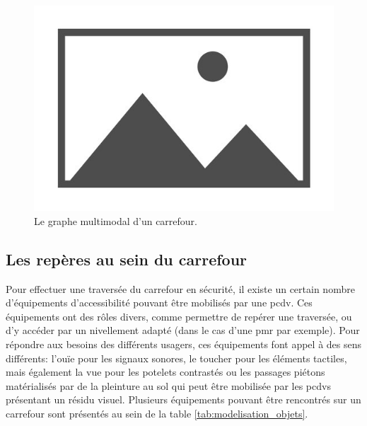 \begin{figure}
    \centering
    \includegraphics{images/placeholder.jpg}
    \caption{Le graphe multimodal d'un carrefour.}
    \label{fig:mod_ex_graphe_carrefour}
\end{figure}



\subsection{Les repères au sein du carrefour}

\label{sec:mod_repere_carrefour}

Pour effectuer une traversée du carrefour en sécurité, il existe un certain nombre d'équipements d'accessibilité pouvant être mobilisés par une \gls{pcdv}. Ces équipements ont des rôles divers, comme permettre de repérer une traversée, ou d'y accéder par un nivellement adapté (dans le cas d'une \gls{pmr} par exemple). Pour répondre aux besoins des différents usagers, ces équipements font appel à des sens différents: l'ouïe pour les signaux sonores, le toucher pour les éléments tactiles, mais également la vue pour les potelets contrastés ou les passages piétons matérialisés par de la pleinture au sol qui peut être mobilisée par les \glspl{pcdv} présentant un résidu visuel. Plusieurs équipements pouvant être rencontrés sur un carrefour sont présentés au sein de la table \ref{tab:modelisation_objets}.

